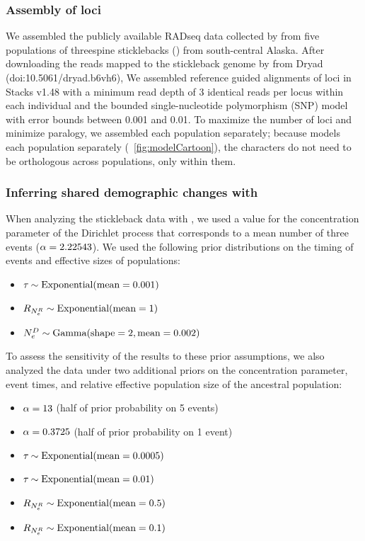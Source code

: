 \subsubsection{Assembly of loci}
We assembled the publicly available RADseq data collected by
\citet{Hohenlohe2010}
from five populations of threespine sticklebacks ()
from south-central Alaska.
After downloading the reads mapped to the stickleback genome by
\citet{Hohenlohe2010}
from Dryad
(doi:10.5061/dryad.b6vh6),
We assembled reference guided alignments of loci in Stacks v1.48
\citet{Catchen2013} with a minimum read depth of 3 identical reads per locus
within each individual and the bounded single-nucleotide polymorphism (SNP)
model with error bounds between
0.001 and 0.01.
To maximize the number of loci and minimize paralogy, we assembled each
population separately;
because \ecoevolity models each population separately
(\fig{}~\ref{fig:modelCartoon}),
the characters do not need to be orthologous across populations, only within
them.

\subsubsection{Inferring shared demographic changes with \ecoevolity}

When analyzing the stickleback data with \ecoevolity, we used a value for the
concentration parameter of the Dirichlet process that corresponds to a mean
number of three events
($\concentration = 2.22543$).
We used the following prior distributions on the timing of events and effective
sizes of populations:
\begin{itemize}
    \item $\etime \sim \dexponential{0.001}$
    \item $\rootrelativepopsize \sim \dexponential{1}$
    \item $\epopsize[\descendantpopindex{}] \sim \dgamma{2}{0.002}$
\end{itemize}
To assess the sensitivity of the results to these prior assumptions,
we also analyzed the data under two additional priors on
the concentration parameter, event times, and relative
effective population size of the ancestral population:
\begin{itemize}
    \item $\concentration = 13$ (half of prior probability on 5 events)
    \item $\concentration = 0.3725$ (half of prior probability on 1 event)
    \item $\etime \sim \dexponential{0.0005}$
    \item $\etime \sim \dexponential{0.01}$
    \item $\rootrelativepopsize \sim \dexponential{0.5}$
    \item $\rootrelativepopsize \sim \dexponential{0.1}$
\end{itemize}

